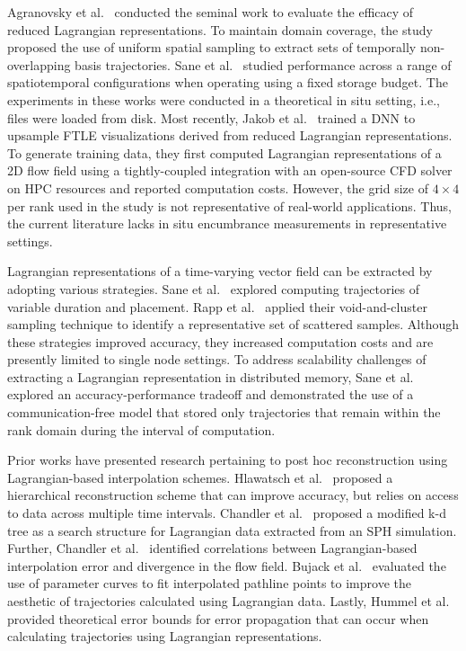 \documentclass[runningheads]{llncs}
\begin{document}
Agranovsky et al.~\cite{agranovsky2014improved} conducted the seminal work to evaluate the efficacy of reduced Lagrangian representations.
%
To maintain domain coverage, the study proposed the use of uniform spatial sampling to extract sets of temporally non-overlapping basis trajectories.
%
Sane et al.~\cite{sane2018revisiting} studied performance across a range of spatiotemporal configurations when operating using a fixed storage budget.
%
The experiments in these works were conducted in a theoretical in situ setting, i.e., files were loaded from disk. %
%
Most recently, Jakob et al.~\cite{Jakob20} trained a DNN to upsample FTLE visualizations derived from reduced Lagrangian representations.
%
To generate training data, they first computed Lagrangian representations of a 2D flow field using a tightly-coupled integration with an open-source CFD solver on HPC resources and reported computation costs.
%
However, the grid size of $4\times4$ per rank used in the study is not representative of real-world applications.
%
Thus, the current literature lacks in situ encumbrance measurements in representative settings.
%

Lagrangian representations of a time-varying vector field can be extracted by adopting various strategies.
%
Sane et al.~\cite{sane2019interpolation} explored computing trajectories of variable duration and placement.
%
Rapp et al.~\cite{rapp2019void} applied their void-and-cluster sampling technique to identify a representative set of scattered samples.
%
Although these strategies improved accuracy, they increased computation costs and are presently limited to single node settings.
%
To address scalability challenges of extracting a Lagrangian representation in distributed memory, Sane et al.~\cite{sane2020scalable} explored an accuracy-performance tradeoff and demonstrated the use of a communication-free model that stored only trajectories that remain within the rank domain during the interval of computation.
%

Prior works have presented research pertaining to post hoc reconstruction using Lagrangian-based interpolation schemes.
%
Hlawatsch et al.~\cite{hlawatsch2011hierarchical} proposed a hierarchical reconstruction scheme that can improve accuracy, but relies on access to data across multiple time intervals.
%
Chandler et al.~\cite{chandler2015interpolation} proposed a modified k-d tree as a search structure for Lagrangian data extracted from an SPH simulation.
%
Further, Chandler et al.~\cite{chandler2016analysis} identified correlations between Lagrangian-based interpolation error and divergence in the flow field.
%
Bujack et al.~\cite{bujack2015lagrangian} evaluated the use of parameter curves to fit interpolated pathline points to improve the aesthetic of trajectories calculated using Lagrangian data.
%
Lastly, Hummel et al.~\cite{hummel2016error} provided theoretical error bounds for error propagation that can occur when calculating trajectories using Lagrangian representations.
%
\end{document}
